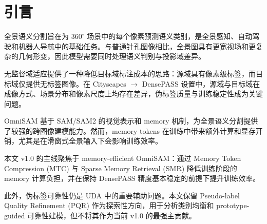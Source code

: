 \section{引言}
\label{sec:introduction}

全景语义分割旨在为 $360^\circ$ 场景中的每个像素预测语义类别，是全景感知、自动驾驶和机器人导航中的基础任务。与普通针孔图像相比，全景图具有更宽视场和更复杂的几何形变，因此模型需要同时处理语义判别与投影域差异。

无监督域适应提供了一种降低目标域标注成本的思路：源域具有像素级标签，而目标域仅提供无标签图像。在 Cityscapes $\rightarrow$ DensePASS 设置中，源域与目标域在成像方式、场景分布和像素尺度上均存在差异，伪标签质量与训练稳定性成为关键问题。

OmniSAM 基于 SAM/SAM2 的视觉表示和 memory 机制，为全景语义分割提供了较强的跨图像建模能力。然而，memory tokens 在训练中带来额外计算和显存开销，尤其是在滑窗式全景输入下会影响训练效率。

本文 v1.0 的主线聚焦于 memory-efficient OmniSAM：通过 Memory Token Compression (MTC) 与 Sparse Memory Retrieval (SMR) 降低训练阶段的 memory 计算负担，并在保持 DensePASS 精度基本稳定的前提下提升训练效率。

此外，伪标签可靠性仍是 UDA 中的重要辅助问题。本文保留 Pseudo-label Quality Refinement (PQR) 作为探索性方向，用于分析类别均衡和 prototype-guided 可靠性建模，但不将其作为当前 v1.0 的最强主贡献。
